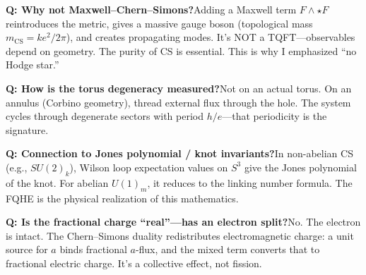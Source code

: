 \documentclass[11pt]{article}
\begin{document}
\medskip
\textbf{Q: Why not Maxwell--Chern--Simons?}\quad Adding a Maxwell term $F\wedge\star F$ reintroduces the metric, gives a massive gauge boson (topological mass $m_{\mathrm{CS}} = ke^2/2\pi$), and creates propagating modes. It's NOT a TQFT---observables depend on geometry. The purity of CS is essential. This is why I emphasized ``no Hodge star.''

\medskip
\textbf{Q: How is the torus degeneracy measured?}\quad Not on an actual torus. On an annulus (Corbino geometry), thread external flux through the hole. The system cycles through degenerate sectors with period $h/e$---that periodicity is the signature.

\medskip
\textbf{Q: Connection to Jones polynomial / knot invariants?}\quad In non-abelian CS (e.g., $SU(2)_k$), Wilson loop expectation values on $S^3$ give the Jones polynomial of the knot. For abelian $U(1)_m$, it reduces to the linking number formula. The FQHE is the physical realization of this mathematics.

\medskip
\textbf{Q: Is the fractional charge ``real''---has an electron split?}\quad No. The electron is intact. The Chern--Simons duality redistributes electromagnetic charge: a unit source for $a$ binds fractional $a$-flux, and the mixed term converts that to fractional electric charge. It's a collective effect, not fission.
\end{document}
